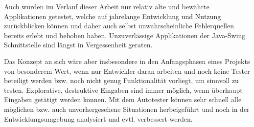 Auch wurden im Verlauf dieser Arbeit nur relativ alte und bewährte
Applikationen getestet, welche auf jahrelange Entwicklung und Nutzung
zurückblicken können und daher auch selbst unwahrscheinliche
Fehlerquellen bereits erlebt und behoben haben. Unzuverlässige
Applikationen der Java-Swing Schnittstelle sind längst in Vergessenheit
geraten.

Das Konzept an sich wäre aber insbesondere in den Anfangsphasen
eines Projekts von besonderem Wert, wenn nur Entwickler daran
arbeiten und noch keine Tester beteiligt werden bzw. noch nicht
genug Funktionalität vorliegt, um sinnvoll zu testen. Explorative,
destruktive Eingaben sind immer möglich, wenn überhaupt
Eingaben getätigt werden können. Mit dem Autotester können
sehr schnell alle möglichen bzw. auch unvorhergesehene Situationen herbeigeführt
und noch in der Entwicklungsumgebung analysiert und evtl.
verbessert werden.
